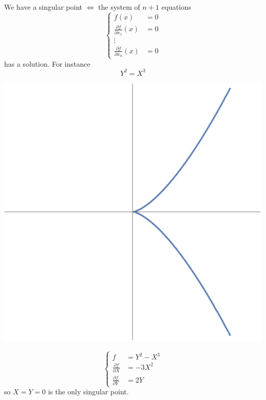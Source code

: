 \documentclass[11pt]{article}
\newcommand{\pd}{\partial}
\newcommand{\Llrta}{\Longleftrightarrow}
\begin{document}
We have a singular point $\Llrta$ the system of $n+1$ equations 
$$
\left\{ \begin{aligned}
f(x)&=0\\
\frac{\pd f}{\pd x_1}(x)&=0\\
\vdots &\\
\frac{\pd f}{\pd x_n}(x)&=0
\end{aligned}\right.
$$
has a solution. 
For instance 
$$
Y^2=X^3
$$
\begin{center}
\includegraphics[scale=0.5]{Y^2-X^3}
\end{center}

$$
\left\{ \begin{aligned}
f&=Y^2-X^3\\
\frac{\pd f}{\pd X}&=-3X^2\\
\frac{\pd f}{\pd Y}&=2Y
\end{aligned}\right.
$$
so $X=Y=0$ is the only singular point.
\end{document}
